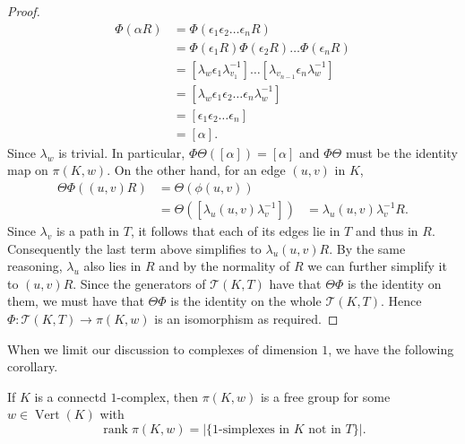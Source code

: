 \begin{proof}
\begin{align*}
  \Phi(\alpha R) &= \Phi(\epsilon_1 \epsilon_2 \dots \epsilon_n R) \\
                 &= \Phi(\epsilon_1 R) \Phi(\epsilon_2 R) \dots \Phi(\epsilon_n R) \\
                 &= [\lambda_w \epsilon_1 \lambda_{v_1}^{-1}]  \dots [\lambda_{v_{n-1}}\epsilon_n \lambda_w^{-1}] \\
                 &= [\lambda_w\epsilon_1 \epsilon_2 \dots \epsilon_n \lambda_w^{-1}] \\
                 &= [\epsilon_1 \epsilon_2 \dots \epsilon_n] \\
                 &= [\alpha].
\end{align*}
Since $\lambda_w$ is trivial. In particular, $\Phi\Theta([\alpha]) = [\alpha]$ and $\Phi\Theta$ must be the identity map on $\pi(K,w)$. On the other hand, for an edge $(u,v)$ in $K$,
\begin{align*}
  \Theta\Phi((u,v) R) &= \Theta(\phi(u,v)) \\
                      &= \Theta([\lambda_u(u,v)\lambda_v^{-1}])
                      &= \lambda_u (u,v) \lambda_v^{-1} R.
\end{align*}
Since $\lambda_v$ is a path in $T$, it follows that each of its edges lie in $T$ and thus in $R$. Consequently the last term above simplifies to $\lambda_u(u,v)R$. By the same reasoning, $\lambda_u$ also lies in $R$ and by the normality of $R$ we can further simplify it to $(u,v) R$. Since the generators of $\mathcal{T}(K,T)$ have that $\Theta\Phi$ is the identity on them, we must have that $\Theta\Phi$ is the identity on the whole $\mathcal{T}(K,T)$. Hence $\Phi: \mathcal{T}(K,T) \rightarrow \pi(K,w)$ is an isomorphism as required.
\end{proof}

When we limit our discussion to complexes of dimension $1$, we have the following corollary.

\begin{corollary}
  \label{cor:1free}
  If $K$ is a connectd $1$-complex, then $\pi(K,w)$ is a free group for some $w \in \operatorname{Vert}(K)$ with
  \begin{equation*}
    \operatorname{rank} \pi(K,w) = |\{1 \text{-simplexes in } K \text{ not in } T \}|.
  \end{equation*}
\end{corollary}

